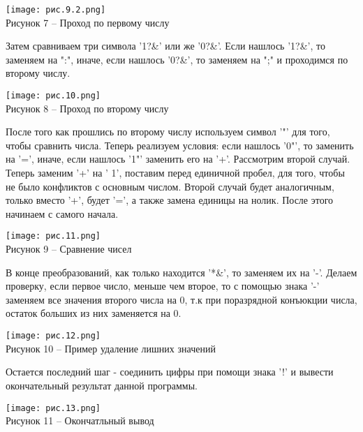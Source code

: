 \documentclass{article}
\begin{document}
\begin{center}
    \texttt{[image: рис.9.2.png]}\\
    \small{Рисунок 7 – Проход по первому числу}
\end{center}

\par Затем сравниваем три символа '1?\&' или же '0?\&'. Если нашлось '1?\&', то заменяем на ":", иначе, если нашлось '0?\&', то заменяем на ";" и проходимся по второму числу.\\

\begin{center}
    \texttt{[image: рис.10.png]}\\
    \small{Рисунок 8 – Проход по второму числу}
\end{center}

\par После того как прошлись по второму числу используем символ '"' для того, чтобы сравнить числа. Теперь реализуем условия: если нашлось '0"', то заменить на '=', иначе, если нашлось '1"' заменить его на '+'. Рассмотрим второй случай. Теперь заменим '+' на ' 1', поставим перед единичной пробел, для того, чтобы не было конфликтов с основным числом. Второй случай будет аналогичным, только вместо '+', будет '=', а также замена единицы на нолик. После этого начинаем с самого начала. \\


\begin{center}
    \texttt{[image: рис.11.png]}\\
    \small{Рисунок 9 – Сравнение чисел }
\end{center}

В конце преобразований, как только находится '*\&', то заменяем их на '-'. Делаем проверку, если первое число, меньше чем второе, то с помощью знака '-' заменяем все значения второго числа на 0, т.к при поразрядной конъюкции числа, остаток больших из них заменяется на 0.

\begin{center}
    \texttt{[image: рис.12.png]}\\
    \small{Рисунок 10 – Пример удаление лишних значений}
\end{center}

Остается последний шаг - соединить цифры при помощи знака '!' и вывести окончательный результат данной программы.


\begin{center}
    \texttt{[image: рис.13.png]}\\
    \small{Рисунок 11 – Окончатльный вывод }
\end{center}
\end{document}
